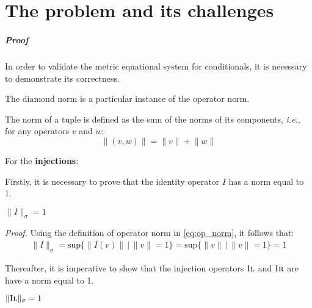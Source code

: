 \chapter{The problem and its challenges}


\paragraph{Proof} In order to validate the metric equational system for conditionals, it is necessary to demonstrate its correctness.

The diamond norm is a particular instance of the operator norm. 
\vspace{15pt}

  The norm of a tuple is defined as the sum of the norms of its components, \textit{i.e.}, for any operators $v$ and $w$:
\begin{equation} \label{eq:norm_tuple}
  \lVert (v,w) \rVert = \lVert v \rVert + \lVert w \rVert
\end{equation}

For the \textbf{injections}:

Firstly, it is necessary to prove that the identity operator $I$ has a norm equal to 1.
\begin{lemma} \label{lemid}
  $ \lVert I \rVert_{\sigma} = 1   $
\end{lemma}

\textit{Proof.} \quad Using the definition of operator norm in \autoref{eq:op_norm}, it follows that:
\begin{equation} 
\begin{split}
  \lVert I \rVert_{\sigma} = \text{sup} \{\lVert I (v) \rVert \hspace{2pt} \vert \hspace{2pt}  \lVert v\rVert =1 \} = \text{sup} \{\lVert v \rVert \hspace{2pt} \vert \hspace{2pt}  \lVert v\rVert =1 \} = 1
\end{split}
\end{equation}

\vspace{10pt}

Thereafter, it is imperative to show that the injection operators $\textsc{Il}$ and $\textsc{Ir}$ are have a norm equal to 1.

\begin{lemma} \label{lemil}
  $ \lVert \textsc{Il} \rVert_{\sigma} = 1   $
\end{lemma}

